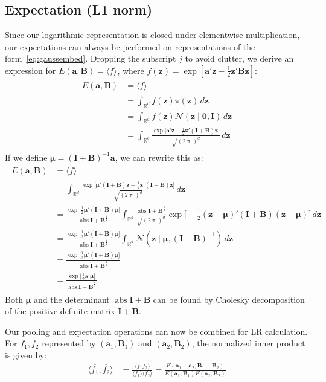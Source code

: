 \documentclass[a4paper,oneside,12pt,english]{report}
\def\zvec{\mathbf{z}}
\def\ND{\mathcal{N}}
\DeclareMathOperator{\abs}{abs}
\def\expv#1#2{\bigl\langle#1\bigr\rangle_{#2}}
\def\expp#1{\bigl\langle#1\bigr\rangle}
\def\R{\mathbb{R}}
\def\Bmat{\mathbf{B}}
\def\Imat{\mathbf{I}}
\def\muvec{\boldsymbol{\mu}}
\def\avec{\mathbf{a}}
\def\nulvec{\boldsymbol{0}}
\def\dot#1#2{\expv{#1,#2}{}}
\def\normal#1{\overline{#1}}
\def\dotn#1#2{\dot{\normal{#1}}{\normal{#2}}}
\begin{document}
\subsection{Expectation (L1 norm)}
Since our logarithmic representation is closed under elementwise multiplication, our expectations can always be performed on representations of the form~\eqref{eq:gaussembed}. Dropping the subscript $j$ to avoid clutter, we derive an expression for $E(\avec,\Bmat)=\expv{f}{}$, where $f(\zvec)=\exp[\avec'\zvec-\frac12\zvec'\Bmat\zvec]$:
\begin{align}
\label{eq:MVGproblem}
\begin{split}
E(\avec,\Bmat) &= \expv{f}{} \\
&= \int_{\R^d} f(\zvec)\pi(\zvec) \,d\zvec \\
&= \int_{\R^d} f(\zvec)\ND(\zvec\mid\nulvec,\Imat) \,d\zvec \\
&= \int_{\R^d} \frac{\exp\bigl[\avec'\zvec -\frac12\zvec'(\Imat+\Bmat)\zvec\bigr]}{\sqrt{(2\uppi)^d}} \,d\zvec 
\end{split}
\end{align}
If we define $\muvec=(\Imat+\Bmat)^{-1}\avec$, we can rewrite this as:
\begin{align}
\label{eq:exactMVG}
\begin{split}
E(\avec,\Bmat) &= \expv{f}{} \\
&= \int_{\R^d} \frac{\exp\bigl[\muvec'(\Imat+\Bmat)\zvec -\frac12\zvec'(\Imat+\Bmat)\zvec\bigr]}{\sqrt{(2\uppi)^d}} \,d\zvec \\
&= \frac{\exp\bigl[\frac12\muvec'(\Imat+\Bmat)\muvec\bigr]}{\abs{\Imat+\Bmat}^{\frac12}}
\int_{\R^d} \frac{\abs{\Imat+\Bmat}^\frac12}{\sqrt{(2\uppi)^d}} \exp\bigl[-\frac12(\zvec-\muvec)'(\Imat+\Bmat)(\zvec-\muvec)\bigr]\,d\zvec \\
&= \frac{\exp\bigl[\frac12\muvec'(\Imat+\Bmat)\muvec\bigr]}{\abs{\Imat+\Bmat}^{\frac12}} \int_{\R^d} \ND(\zvec\mid\muvec,(\Imat+\Bmat)^{-1}) \,d\zvec \\
&= \frac{\exp\bigl[\frac12\muvec'(\Imat+\Bmat)\muvec\bigr]}{\abs{\Imat+\Bmat}^{\frac12}} \\
&= \frac{\exp\bigl[\frac12\avec'\muvec\bigr]}{\abs{\Imat+\Bmat}^{\frac12}} 
\end{split}
\end{align}
Both $\muvec$ and the determinant $\abs{\Imat+\Bmat}$ can be found by Cholesky decomposition of the positive definite matrix $\Imat+\Bmat$. 

Our pooling and expectation operations can now be combined for LR calculation. For $f_1,f_2$ represented by $(\avec_1,\Bmat_1)$ and $(\avec_2,\Bmat_2)$, the normalized inner product is given by:
\begin{align}
\dotn{f_1}{f_2} &= \frac{\expp{f_1f_2}}{\expp{f_1}\expp{f_2}} = \frac{E(\avec_1+\avec_2,\Bmat_1+\Bmat_2)}{E(\avec_1,\Bmat_1)E(\avec_2,\Bmat_2)}
\end{align}
\end{document}
